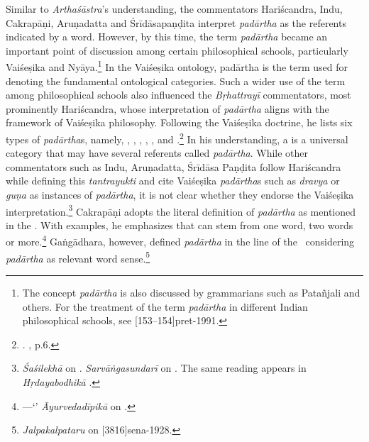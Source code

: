 Similar to \emph{Arthaśāstra}'s understanding, the commentators 
Hariścandra, Indu, Cakrapāṇi, Aruṇadatta and Śrīdāsapaṇḍita 
interpret \emph{padārtha} as the referents indicated by a word. 
However, by this time, the term \emph{padārtha} became 
an important point of discussion among certain philosophical schools, 
particularly Vaiśeṣika and Nyāya.\footnote{
	The concept \emph{padārtha} is also discussed by grammarians such as 
Patañjali and others. For the treatment of the term \emph{padārtha} in different 
Indian philosophical schools, see [153--154]{pret-1991}.} 
In the Vaiśeṣika ontology, padārtha is the term used for denoting the 
fundamental ontological categories. 
Such a wider use of the term among philosophical schools also influenced the 
\emph{Bṛhattrayī} commentators, 
most prominently Hariścandra, whose interpretation of \emph{padārtha} aligns 
with the framework of Vaiśeṣika philosophy. Following the Vaiśeṣika doctrine, he 
lists six types of \emph{padārtha}s, namely, , 
, , , 
, and .\footnote{
	. 
	, p.6.} 
In his understanding, a  is a universal category 
that may have several referents called \emph{padārtha}.
While other commentators such as 
Indu, Aruṇadatta, Śrīdāsa Paṇḍita follow Hariścandra 
while defining this \emph{tantrayukti} and
cite Vaiśeṣika \emph{padārtha}s 
such as \emph{dravya} or \emph{guṇa} as instances of \emph{padārtha}, 
it is not clear whether they endorse the Vaiśeṣika interpretation.\footnote{
		 \emph{Śaśilekhā} on 
.
		 \emph{Sarvāṅgasundarī} on 
.
		The	same reading appears in \emph{Hṛdayabodhikā} 
\parencite[2]{muss-1940}.} 
Cakrapāṇi adopts the literal definition of \emph{padārtha} as mentioned in the 
\SS. 
With examples, he emphasizes that  
can stem from one word, two words or more.\footnote{
		---‘’ 
		\emph{Āyurvedadīpikā} on .} 
Gaṅgādhara, however, defined \emph{padārtha} in the line of the \SS\ 
considering \emph{padārtha} as relevant word sense.\footnote{
		 \emph{Jalpakalpataru} on 
[3816]{sena-1928}.}


